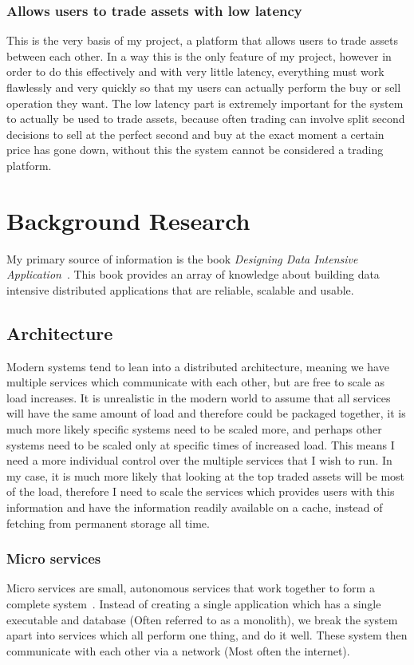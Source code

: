 \documentclass[titlepage]{article}
\begin{document}
\subsubsection{Allows users to trade assets with low latency}
This is the very basis of my project, a platform that allows users to trade assets between each other. In a way this is the only feature of my project, however in order to do this effectively and with very little latency, everything must work flawlessly and very quickly so that my users can actually perform the buy or sell operation they want. The low latency part is extremely important for the system to actually be used to trade assets, because often trading can involve split second decisions to sell at the perfect second and buy at the exact moment a certain price has gone down, without this the system cannot be considered a trading platform.

\section{Background Research}
My primary source of information is the book \textit{Designing Data Intensive Application}~\cite{kleppmann_2021}. This book provides an array of knowledge about building data intensive distributed applications that are reliable, scalable and usable.

\subsection{Architecture}
Modern systems tend to lean into a distributed architecture, meaning we have multiple services which communicate with each other, but are free to scale as load increases. It is unrealistic in the modern world to assume that all services will have the same amount of load and therefore could be packaged together, it is much more likely specific systems need to be scaled more, and perhaps other systems need to be scaled only at specific times of increased load. This means I need a more individual control over the multiple services that I wish to run. In my case, it is much more likely that looking at the top traded assets will be most of the load, therefore I need to scale the services which provides users with this information and have the information readily available on a cache, instead of fetching from permanent storage all time. 

\subsubsection{Micro services}
Micro services are small, autonomous services that work together to form a complete system~\cite{newman_2016}. Instead of creating a single application which has a single executable and database (Often referred to as a monolith), we break the system apart into services which all perform one thing, and do it well. These system then communicate with each other via a network (Most often the internet). \\
\end{document}
